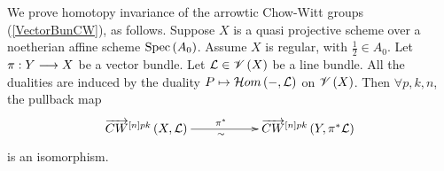 \documentclass[12pt]{article}
\begin{document}
We prove homotopy invariance of the arrowtic Chow-Witt groups (\ref{VectorBunCW}), as follows. 
\bT\label{homoThmIntro}{\rm 
Suppose $X$ is a quasi projective scheme over a noetherian affine scheme $\mathrm{Spec}\left(A_0\right)$. Assume   $X$ is regular,
with $\frac{1}{2}\in A_0$.  Let 
$\pi: Y \longrightarrow X$ be a vector bundle. %
Let ${\mathcal{L}}\in {\mathscr {V}}\left( X\right)$ be a line bundle. All the dualities are induced by 
the duality $P \mapsto {\mathcal{H}}om\left( -, {\mathcal{L}}\right)$ on ${\mathscr {V}}\left( X\right)$.
 Then $\forall p, k, n$, the pullback map
$$
\diagram 
\ora{CW}^{\LRt{n}pk} \LRf{X,  {\CL}} \ar[rr]^{\pi^*\quad}_{\sim\quad} && \ora{CW}^{\LRt{n}pk}\LRf{Y,  \pi^*{\CL}} \\
\enddiagram 
$$
is  an isomorphism.  
}
\eT
\end{document}
